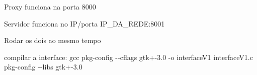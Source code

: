 Proxy funciona na porta 8000

Servidor funciona no I\+P/porta I\+P\+\_\+\+D\+A\+\_\+\+R\+E\+DE\+:8001

Rodar os dois ao mesmo tempo

compilar a interface\+: gcc {\ttfamily pkg-\/config -\/-\/cflags gtk+-\/3.0} -\/o interface\+V1 interface\+V1.\+c {\ttfamily pkg-\/config -\/-\/libs gtk+-\/3.0} 